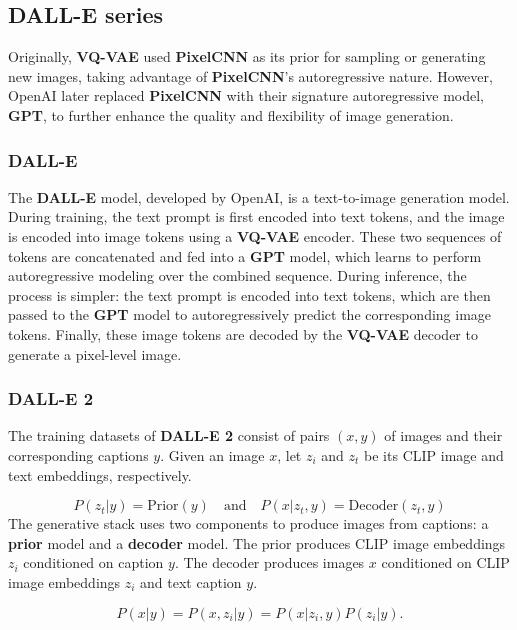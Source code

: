 \documentclass{article}
\begin{document}
\subsection{DALL-E series}

Originally, \textbf{VQ-VAE} used \textbf{PixelCNN} as its prior for sampling or generating new images, taking 
advantage of \textbf{PixelCNN}'s autoregressive nature. However, OpenAI later replaced \textbf{PixelCNN} 
with their signature autoregressive model, \textbf{GPT}, to further enhance the quality and flexibility of 
image generation.

\subsubsection{DALL-E}

The \textbf{DALL-E} model, developed by OpenAI, is a text-to-image generation model. During training, the 
text prompt is first encoded into text tokens, and the image is encoded into image tokens using a 
\textbf{VQ-VAE} encoder. These two sequences of tokens are concatenated and fed into a \textbf{GPT} model, 
which learns to perform autoregressive modeling over the combined sequence.
During inference, the process is simpler: the text prompt is encoded into text tokens, which are then passed 
to the \textbf{GPT} model to autoregressively predict the corresponding image tokens. Finally, these image 
tokens are decoded by the \textbf{VQ-VAE} decoder to generate a pixel-level image.

\subsubsection{DALL-E 2}

The training datasets of \textbf{DALL-E 2} consist of pairs $(x, y)$ of images and their corresponding 
captions $y$. Given an image $x$, let $z_i$ and $z_t$ be its CLIP image and text embeddings, respectively.

\begin{equation}
P(z_t | y) = \text{Prior}(y) \quad \text{and} \quad P(x | z_t, y) = \text{Decoder}(z_t, y)
\end{equation}
The generative stack uses two components to produce images from captions: a \textbf{prior} model and a 
\textbf{decoder} model. The prior produces CLIP image embeddings $z_i$ conditioned on caption $y$. The 
decoder produces images $x$ conditioned on CLIP image embeddings $z_i$ and text caption $y$.

\begin{equation}
P(x|y) = P(x, z_i | y) = P(x|z_i, y) P(z_i|y).
\end{equation}
\end{document}
